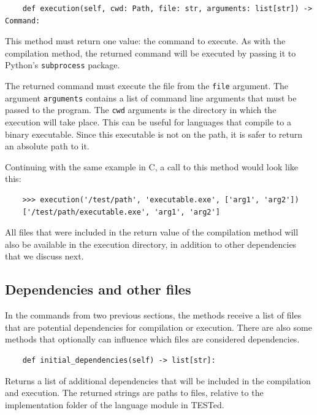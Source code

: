 \documentclass[../main]{subfiles}
\begin{document}
\begin{verbatim}
    def execution(self, cwd: Path, file: str, arguments: list[str]) -> Command:
\end{verbatim}

This method must return one value: the command to execute.
As with the compilation method, the returned command will be executed by passing it to Python's \texttt{subprocess} package.

The returned command must execute the file from the \texttt{file} argument.
The argument \texttt{arguments} contains a list of command line arguments that must be passed to the program.
The \texttt{cwd} arguments is the directory in which the execution will take place.
This can be useful for languages that compile to a binary executable.
Since this executable is not on the path, it is safer to return an absolute path to it.

Continuing with the same example in C, a call to this method would look like this:

\begin{verbatim}
    >>> execution('/test/path', 'executable.exe', ['arg1', 'arg2'])
    ['/test/path/executable.exe', 'arg1', 'arg2']
\end{verbatim}

All files that were included in the return value of the compilation method will also be available in the execution directory, in addition to other dependencies that we discuss next.

\subsection{Dependencies and other files}\label{subsec:dependencies-and-other-files}

In the commands from two previous sections, the methods receive a list of files that are potential dependencies for compilation or execution.
There are also some methods that optionally can influence which files are considered dependencies.

\begin{verbatim}
    def initial_dependencies(self) -> list[str]:
\end{verbatim}

Returns a list of additional dependencies that will be included in the compilation and execution.
The returned strings are paths to files, relative to the implementation folder of the language module in TESTed.
\end{document}
